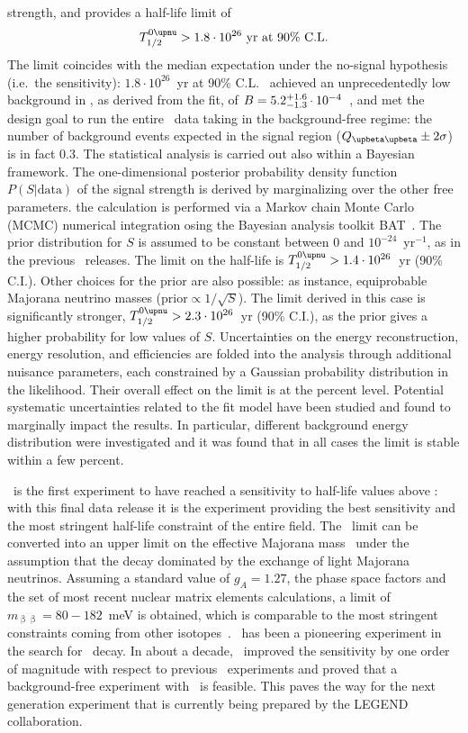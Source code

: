 strength, and provides a half-life limit of
\[
  \thalfzeroM > 1.8 \cdot 10^{26}~\text{yr at 90\% C.L.}
\]
The limit coincides with the median expectation under the no-signal hypothesis (i.e.~the
sensitivity): $1.8 \cdot 10^{26}$~yr at 90\% C.L. \gerda\ achieved an unprecedentedly low
background in \phasetwo, as derived from the fit, of $B = {5.2}\substack{+1.6 \\ -1.3}
\cdot 10^{-4}$~\ctsper, and met the design goal to run the entire \phaseone\ data taking
in the background-free regime: the number of background events expected in the signal
region ($\qbbM \pm 2\sigma$) is in fact 0.3.
\newpar
The statistical analysis is carried out also within a Bayesian framework. The
one-dimensional posterior probability density function $P(S|\text{data})$ of the signal
strength is derived by marginalizing over the other free parameters. the calculation is
performed via a Markov chain Monte Carlo (MCMC) numerical integration osing the Bayesian
analysis toolkit BAT~\cite{Caldwell2008}. The prior distribution for $S$ is assumed to be
constant between 0 and $10^{-24}$~yr$^{-1}$, as in the previous \gerda\ releases. The
limit on the half-life is $\thalfzeroM > 1.4 \cdot 10^{26}$~yr (90\% C.I.). Other choices
for the prior are also possible: as instance, equiprobable Majorana neutrino masses
($\text{prior} \propto 1/\sqrt{S}$). The limit derived in this case is significantly
stronger, $\thalfzeroM > 2.3 \cdot 10^{26}$~yr (90\% C.I.), as the prior gives a higher
probability for low values of $S$.
\newpar
Uncertainties on the energy reconstruction, energy resolution, and efficiencies are folded
into the analysis through additional nuisance parameters, each constrained by a Gaussian
probability distribution in the likelihood. Their overall effect on the limit is at the
percent level. Potential systematic uncertainties related to the fit model have been
studied and found to marginally impact the results. In particular, different background
energy distribution were investigated and it was found that in all cases the limit is
stable within a few percent.

\gerda\ is the first experiment to have reached a sensitivity to half-life values above
: with this final data release it is the experiment providing the best
sensitivity and the most stringent half-life constraint of the entire field.
\newpar
The \thalfzero\ limit can be converted into an upper limit on the effective Majorana mass
\mbb\ under the assumption that the decay dominated by the exchange of light Majorana
neutrinos. Assuming a standard value of $g_A = 1.27$, the phase space factors and the set
of most recent nuclear matrix elements calculations, a limit of $m_{\upbeta\upbeta} = 80 -
182$~meV is obtained, which is comparable to the most stringent constraints coming from
other isotopes~\cite{Anton2019, Gando2016, Adams2019}. \gerda\ has been a pioneering
experiment in the search for \onbb\ decay.  In about a decade, \gerda\ improved the
sensitivity by one order of magnitude with respect to previous \gesix\ experiments and
proved that a background-free experiment with \gesix\ is feasible. This paves the way for
the next generation experiment that is currently being prepared by the LEGEND
collaboration.

